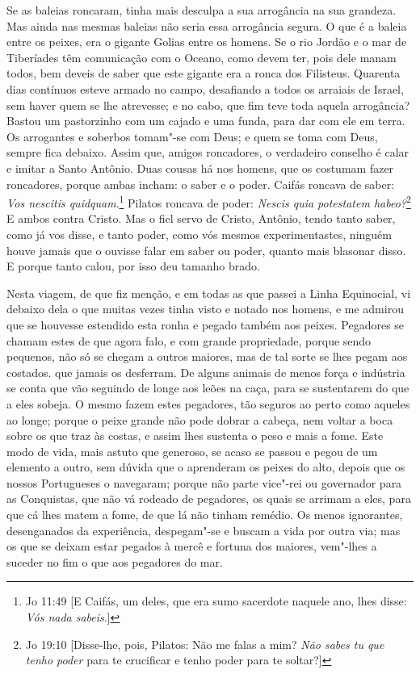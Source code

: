 Se as baleias roncaram, tinha mais desculpa a sua arrogância na sua
grandeza. Mas ainda nas mesmas baleias não seria essa arrogância segura.
O que é a baleia entre os peixes, era o gigante Golias entre os homens.
Se o rio Jordão e o mar de Tiberíades têm comunicação com o Oceano, como
devem ter, pois dele manam todos, bem deveis de saber que este gigante
era a ronca dos Filisteus. Quarenta dias contínuos esteve armado no
campo, desafiando a todos os arraiais de Israel, sem haver quem se lhe
atrevesse; e no cabo, que fim teve toda aquela arrogância? Bastou um
pastorzinho com um cajado e uma funda, para dar com ele em terra. Os
arrogantes e soberbos tomam"-se com Deus; e quem se toma com Deus, sempre
fica debaixo. Assim que, amigos roncadores, o verdadeiro conselho é
calar e imitar a Santo Antônio. Duas cousas há nos homens, que os
costumam fazer roncadores, porque ambas incham: o saber e o poder.
Caifás roncava de saber: \emph{Vos nescitis quidquam}.\footnote{Jo 11:49 [E Caifás, um deles, que era sumo sacerdote naquele ano, lhes disse: \emph{Vós nada sabeis}.]} Pilatos roncava de poder: \emph{Nescis quia potestatem habeo?}\footnote{Jo 19:10 [Disse-lhe, pois, Pilatos: Não me falas a mim? \emph{Não sabes tu que tenho poder} para te
crucificar e tenho poder para te soltar?]} E ambos contra Cristo.
Mas o fiel servo de Cristo, Antônio, tendo tanto saber, como já vos
disse, e tanto poder, como vós mesmos experimentastes, ninguém houve
jamais que o ouvisse falar em saber ou poder, quanto mais blasonar
disso. E porque tanto calou, por isso deu tamanho brado.

Nesta viagem, de que fiz menção, e em todas as que passei a Linha
Equinocial, vi debaixo dela o que muitas vezes tinha visto e notado nos
homens, e me admirou que se houvesse estendido esta ronha e pegado
também aos peixes. Pegadores se chamam estes de que agora falo, e com
grande propriedade, porque sendo pequenos, não só se chegam a outros
maiores, mas de tal sorte se lhes pegam aos costados. que jamais os
desferram. De alguns animais de menos força e
indústria se conta que vão seguindo de longe aos leões na caça, para se
sustentarem do que a eles sobeja. O mesmo fazem estes pegadores, tão
seguros ao perto como aqueles ao longe; porque o peixe grande não pode
dobrar a cabeça, nem voltar a boca sobre os que traz às costas, e assim
lhes sustenta o peso e mais a fome.
Este modo de vida, mais astuto que generoso, se acaso se passou e pegou
de um elemento a outro, sem dúvida que o aprenderam os peixes do alto,
depois que os nossos Portugueses o navegaram; porque não parte vice"-rei
ou governador para as Conquistas, que não vá rodeado de pegadores, os
quais se arrimam a eles, para que cá lhes matem a fome, de que lá não
tinham remédio. Os menos ignorantes, desenganados da experiência,
despegam"-se e buscam a vida por outra via; mas os que se deixam estar
pegados à mercê e fortuna dos maiores, vem"-lhes a suceder no fim o que
aos pegadores do mar.

